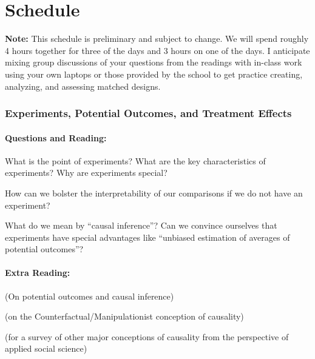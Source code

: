 \documentclass[10pt, letterpaper]{article}
\begin{document}
  \part{Schedule}

  \textbf{Note: } This schedule is preliminary and subject to change. We will
  spend roughly 4 hours together for three of the days and 3 hours on one of
  the days. I anticipate mixing  group discussions of your questions from the
  readings with in-class work using your own laptops or those provided by the
  school to get practice creating, analyzing, and assessing matched designs.


\section{Experiments, Potential Outcomes, and Treatment Effects}

\subsection{Questions and Reading:}

What is the point of experiments? What are the key characteristics of
experiments? Why are experiments special?

\citealp{kinder1993behalf}

\citealp[Chap 1]{gerber2012field}

How can we bolster the interpretability of our comparisons if we do not have
an experiment? 

\citealp[Chap 1]{rosenbaum2010design}

What do we mean by ``causal inference''? Can we convince ourselves that
experiments have special advantages like ``unbiased estimation of averages of
potential outcomes''?

\citealp[Chap 2]{gerber2012field}

\subsection{Extra Reading:}

\citealp[Chap 9.0 --  9.3]{gelman2007dau} (On potential outcomes and causal
inference)


\citealp[Chap 2]{angrist2009mostly}

\citealp{holland:1986a} (on the Counterfactual/Manipulationist conception of
causality)

\citealp{brady2008cae} (for a survey of other major conceptions of causality from
the perspective of applied social science)
\end{document}
